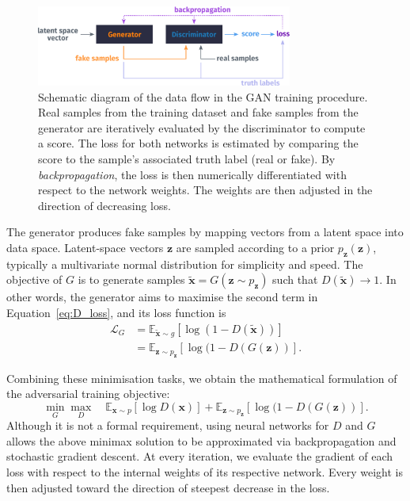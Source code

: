 \begin{figure}
    \centering
    \includegraphics[width=0.75\textwidth]{chapter4/gan_diagram.pdf}
    \caption{
        Schematic diagram of the data flow in the GAN training procedure. Real samples from the training dataset and fake samples from the generator
        are iteratively evaluated by the discriminator to compute a score. The loss for
        both networks is estimated by comparing the score to the sample's associated
        truth label (real or fake). By \emph{backpropagation}, the loss is then
        numerically differentiated with respect to the network weights. The
        weights are then adjusted in the direction of decreasing loss.
    }
    \label{fig:gan_diagram}
\end{figure}


The generator produces fake samples by mapping vectors from a latent space into
data space. Latent-space vectors $\bm{z}$ are sampled according to a prior
$p_{\bm{z}}(\bm{z})$, typically a multivariate normal distribution for
simplicity and speed. The objective of $G$ is to generate samples
$\tilde{\bm{x}} = G(\bm{z} \sim p_{\bm{z}})$ such that
$D(\tilde{\bm{x}}) \rightarrow 1$. In other words, the generator aims to
maximise the second term in Equation~\ref{eq:D_loss}, and its loss function is
\begin{align}\label{eq:GAN_gen}
    \mathcal{L}_G & =
    \mathbb{E}_{\tilde{\bm{x}} \sim g} [ \log( 1 - D(\tilde{\bm{x}}) )]\nonumber        \\
                  & = \mathbb{E}_{\bm{z} \sim p_{\bm{z}}} [ \log( 1 - D(G(\bm{z}) )].
\end{align}

Combining these minimisation tasks, we obtain the mathematical formulation of
the adversarial training objective:
\begin{equation}\label{eq:GAN}
    \min_G \max_D \quad
    \mathbb{E}_{\bm{x} \sim p} [ \log D(\bm{x}) ] +
    \mathbb{E}_{\bm{z} \sim p_{\bm{z}}} [ \log( 1 - D(G(\bm{z}) )].
\end{equation}
Although it is not a formal requirement, using neural networks for $D$ and $G$
allows the above minimax solution to be approximated via backpropagation and
stochastic gradient descent. At every iteration, we evaluate the gradient of
each loss with respect to the internal weights of its respective network. Every
weight is then adjusted toward the direction of steepest decrease in the loss.



